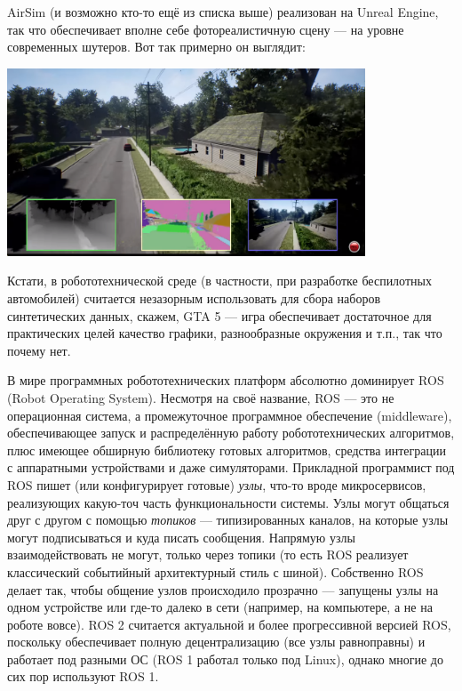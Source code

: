 \documentclass{../../text-style}
\begin{document}
AirSim (и возможно кто-то ещё из списка выше) реализован на Unreal Engine, так что обеспечивает вполне себе фотореалистичную сцену --- на уровне современных шутеров. Вот так примерно он выглядит:

\begin{center}
    \includegraphics[width=0.8\textwidth]{airSim.png}
\end{center}

Кстати, в робототехнической среде (в частности, при разработке беспилотных автомобилей) считается незазорным использовать для сбора наборов синтетических данных, скажем, GTA 5 --- игра обеспечивает достаточное для практических целей качество графики, разнообразные окружения и т.п., так что почему нет. 

В мире программных робототехнических платформ абсолютно доминирует ROS (Robot Operating System).
Несмотря на своё название, ROS --- это не операционная система, а промежуточное программное обеспечение (middleware), обеспечивающее запуск и распределённую работу робототехнических алгоритмов, плюс имеющее обширную библиотеку готовых алгоритмов, средства интеграции с аппаратными устройствами и даже симуляторами.
Прикладной программист под ROS пишет (или конфигурирует готовые) \emph{узлы}, что-то вроде микросервисов, реализующих какую-точ часть функциональности системы. 
Узлы могут общаться друг с другом с помощью \emph{топиков} --- типизированных каналов, на которые узлы могут подписываться и куда писать сообщения.
Напрямую узлы взаимодействовать не могут, только через топики (то есть ROS реализует классический событийный архитектурный стиль с шиной).
Собственно ROS делает так, чтобы общение узлов происходило прозрачно --- запущены узлы на одном устройстве или где-то далеко в сети (например, на компьютере, а не на роботе вовсе).
ROS 2 считается актуальной и более прогрессивной версией ROS, поскольку обеспечивает полную децентрализацию (все узлы равноправны) и работает под разными ОС (ROS 1 работал только под Linux), однако многие до сих пор используют ROS 1.
\end{document}
